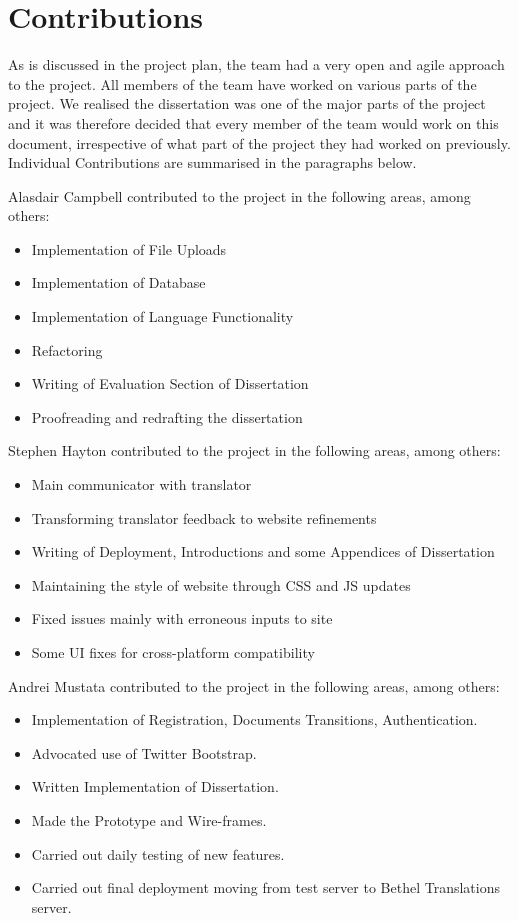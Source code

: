 \documentclass{l3proj}
\begin{document}
\section{Contributions}
\label{sec:contrib}
As is discussed in the project plan, the team had a very open and agile approach to the project.
All members of the team have worked on various parts of the project. 
We realised the dissertation was one of the major parts of the project and it was therefore decided that
every member of the team would work on this document, irrespective of what part of the project they had worked on previously.
Individual Contributions are summarised in the paragraphs below.

Alasdair Campbell contributed to the project in the following areas, among others:
\begin{itemize}
\item{Implementation of File Uploads}
\item{Implementation of Database}
\item{Implementation of Language Functionality}
\item{Refactoring}
\item{Writing of Evaluation Section of Dissertation}
\item{Proofreading and redrafting the dissertation}
\end{itemize}
Stephen Hayton contributed to the project in the following areas, among others:
\begin{itemize}
\item{Main communicator with translator}
\item{Transforming translator feedback to website refinements}
\item{Writing of Deployment, Introductions and some Appendices of Dissertation}
\item{Maintaining the style of website through CSS and JS updates}
\item{Fixed issues mainly with erroneous inputs to site}
\item{Some UI fixes for cross-platform compatibility}
\end{itemize}
Andrei Mustata contributed to the project in the following areas, among others:
\begin{itemize}
\item{Implementation of Registration, Documents Transitions, Authentication.}
\item{Advocated use of Twitter Bootstrap.}
\item{Written Implementation of Dissertation.}
\item{Made the Prototype and Wire-frames.}
\item{Carried out daily testing of new features.}
\item{Carried out final deployment moving from test server to Bethel Translations server.}
\end{itemize}
\end{document}
